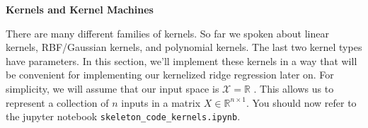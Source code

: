 \documentclass{article}
\newcommand{\nyuparagrah}[1]{\textcolor{nyupurple}{\large #1}}
\theoremstyle{plain}
\theoremstyle{definition}
\begin{document}
\nyuparagrah{\bf Kernels and Kernel Machines}

There are many different families of kernels. So far we spoken
about linear kernels, RBF/Gaussian kernels, and polynomial kernels.
The last two kernel types have parameters. In this section, we'll
implement these kernels in a way that will be convenient for implementing
our kernelized ridge regression later on. For simplicity,
we will assume that our input space is $\mathcal{X}=\mathbb{R}$
.
 This allows
us to represent a collection of $n$ inputs in a matrix $X\in\mathbb{R}^{n\times 1}$. 
You should now refer to the jupyter notebook \texttt{skeleton\_code\_kernels.ipynb}.
\end{document}
